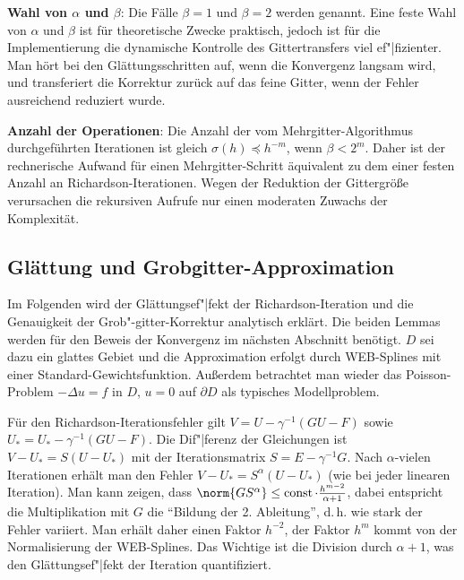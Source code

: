 \linie

\textbf{Wahl von $\alpha$ und $\beta$}:
Die Fälle $\beta = 1$ und $\beta = 2$ werden  genannt.
Eine feste Wahl von $\alpha$ und $\beta$ ist für theoretische Zwecke praktisch,
jedoch ist für die Implementierung die dynamische Kontrolle des Gittertransfers viel ef"|fizienter.
Man hört bei den Glättungsschritten auf, wenn die Konvergenz langsam wird, und
transferiert die Korrektur zurück auf das feine Gitter, wenn der Fehler ausreichend
reduziert wurde.

\linie

\textbf{Anzahl der Operationen}:
Die Anzahl der vom Mehrgitter-Algorithmus durchgeführten Iterationen ist gleich
$\sigma(h) \preceq h^{-m}$, wenn $\beta < 2^m$.
Daher ist der rechnerische Aufwand für einen Mehrgitter-Schritt äquivalent zu dem einer festen
Anzahl an Richardson-Iterationen.
Wegen der Reduktion der Gittergröße verursachen die rekursiven Aufrufe nur einen moderaten
Zuwachs der Komplexität.

\subsection{%
    Glättung und Grobgitter-Approximation%
}

Im Folgenden wird der Glättungsef"|fekt der Richardson-Iteration und die Genauigkeit der
Grob"-gitter-Korrektur analytisch erklärt.
Die beiden Lemmas werden für den Beweis der Konvergenz im nächsten Abschnitt benötigt.
$D$ sei dazu ein glattes Gebiet und die Approximation erfolgt durch WEB-Splines mit einer
Standard-Gewichtsfunktion.
Außerdem betrachtet man wieder das Poisson-Problem $-\Delta u = f$ in $D$,
$u = 0$ auf $\partial D$ als typisches Modellproblem.

Für den Richardson-Iterationsfehler gilt
$V = U - \gamma^{-1} (GU - F)$ sowie $U_\ast = U_\ast - \gamma^{-1} (GU - F)$.
Die Dif"|ferenz der Gleichungen ist $V - U_\ast = S(U - U_\ast)$ mit
der Iterationsmatrix $S = E - \gamma^{-1} G$.
Nach $\alpha$-vielen Iterationen erhält man den Fehler
$V - U_\ast = S^\alpha (U - U_\ast)$
(wie bei jeder linearen Iteration).
Man kann zeigen, dass $\norm{GS^\alpha} \le \const \cdot \frac{h^{m-2}}{\alpha+1}$,
dabei entspricht die Multiplikation mit $G$ die "`Bildung der 2. Ableitung"',
d.\,h. wie stark der Fehler variiert.
Man erhält daher einen Faktor $h^{-2}$,
der Faktor $h^m$ kommt von der Normalisierung der WEB-Splines.
Das Wichtige ist die Division durch $\alpha + 1$, was den Glättungsef"|fekt der Iteration
quantifiziert.

